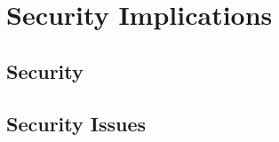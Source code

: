 \section{Security Implications}
\label{sec:security}

\subsection{Security}
\label{sec:security:sec}

 
\subsection{Security Issues}
\label{sec:security:issues}
